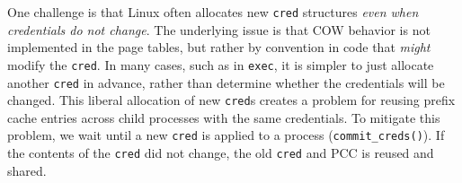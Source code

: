 



One challenge is that Linux often 
allocates new {\tt cred} structures {\em even when credentials do not change}.
The underlying issue is that COW behavior is not implemented in the page tables, 
but rather by convention in code that {\em might} modify the {\tt cred}.
In many cases, such as in {\tt exec}, it is simpler to just allocate another {\tt cred} in advance,
rather than determine whether the credentials will be changed.
This liberal allocation of new {\tt cred}s 
creates a problem for reusing prefix cache entries across child processes 
with the same credentials.
To mitigate this problem, we wait until a new {\tt cred}
is applied to a process ({\tt commit\_creds()}).
If the contents of the {\tt cred} did not change, the old {\tt cred} and PCC is reused and shared.


